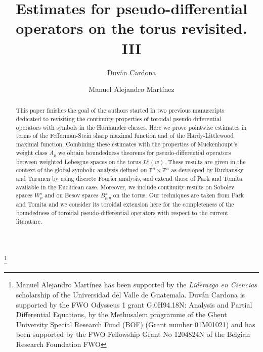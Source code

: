 \documentclass[12pt, reqno]{amsart}
\theoremstyle{definition}
\theoremstyle{remark}
\numberwithin{equation}{section}
\begin{document}
\setcounter{page}{1}

\title[Estimates for operators on the torus. III]{Estimates for pseudo-differential operators on the torus revisited. III}




\author[D. Cardona]{Duv\'an Cardona}
\address{
  Duv\'an Cardona:
  \endgraf
  Department of Mathematics: Analysis, Logic and Discrete Mathematics
  \endgraf
  Ghent University, Belgium
  \endgraf
  {\it E-mail address} {\rm duvanc306@gmail.com, duvan.cardonasanchez@ugent.be}
  }



\author[M. A. Mart\'inez]{Manuel Alejandro Mart\'inez}
\address{
  Manuel Alejandro Mart\'inez
  \endgraf
  Department of Mathematics
  \endgraf
 Universidad del Valle de Guatemala, Guatemala
  \endgraf
  {\it E-mail address} {\rm mar21403@uvg.edu.gt, manuelalejandromartinezf@gmail.com}
  } 


  
  




\thanks{ Manuel Alejandro Mart\'inez has been supported by the {\it{Liderazgo en Ciencias}} scholarship of the Universidad del Valle de Guatemala.  Duv\'an Cardona is supported  by the FWO  Odysseus  1  grant  G.0H94.18N:  Analysis  and  Partial Differential Equations, by the Methusalem programme of the Ghent University Special Research Fund (BOF)
(Grant number 01M01021) and has been supported by the FWO Fellowship
Grant No 1204824N of the Belgian Research Foundation FWO}


\begin{abstract}
    This paper finishes  the goal of the authors started in two previous manuscripts dedicated to revisiting the continuity properties of toroidal pseudo-differential operators with symbols in the H\"ormander classes. Here we prove pointwise estimates in terms of the Fefferman-Stein sharp maximal function and of the Hardy-Littlewood maximal function. Combining these estimates with the properties of  Muckenhoupt's weight class $A_p$ we obtain boundedness theorems for pseudo-differential operators between weighted Lebesgue spaces on the torus $L^p(w)$. These results are given in the context of the global symbolic analysis defined on $\mathbb{T}^n\times \mathbb{Z}^n$ as developed by Ruzhansky and Turunen by using discrete Fourier analysis, and extend those of Park and Tomita available in the Euclidean case.   Moreover, we include continuity results on Sobolev spaces $W^s_p$ and on Besov spaces $B^s_{p,q}$ on the torus. Our techniques are taken from Park and Tomita \cite{park-tomita} and we consider its toroidal extension here for the completeness of the boundedness of toroidal pseudo-differential operators with respect to the current literature.
\end{abstract} 
\end{document}
